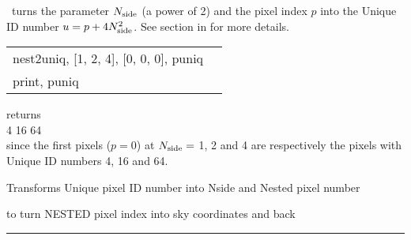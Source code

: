 \begin{codedescription}
{\thedocid\ turns the parameter $N_{\rm side}$ (a power of 2) and the pixel index $p$ into the Unique ID number $u = p + 4 N_{\rm side}^2$. See  section in 
 for more details.
}
\end{codedescription}


\begin{example}
{
\begin{tabular}{ll} %
nest2uniq, [1, 2, 4], [0, 0, 0], puniq\\
print, puniq
\end{tabular}
}
{
\begin{minipage}{11cm}
returns  \\
   4 \hskip 1cm 16 \hskip 1cm 64 \\
since the first pixels ($p=0$) at $N_{\rm side}=$ 1, 2 and 4 are respectively the pixels with Unique ID numbers 4, 16 and 64.
\end{minipage}
}
\end{example}


\begin{related}
  \begin{sulist}{} %
  \item[\htmlref{uniq2nest}{idl:uniq2nest}] Transforms Unique \healpix pixel ID number into Nside and Nested pixel number
  \item[\htmlref{pix2xxx,...}{idl:pix_tools}] to turn NESTED pixel index into sky coordinates and back
  \end{sulist}
\end{related}

\rule{\hsize}{2mm}

